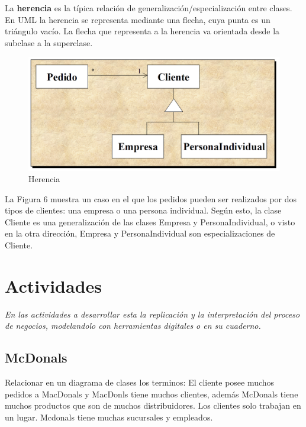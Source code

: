 \documentclass[12pt,letterpaper]{article}
\begin{document}
La \textbf{herencia} es la típica relación de generalización/especialización entre clases. En UML la herencia se representa mediante una flecha, cuya punta es un triángulo vacío. La flecha que representa a la herencia va orientada desde la subclase a la superclase.\\
	\begin{figure}[H]
		\centering
		\includegraphics[scale=0.2]{img/herencia.PNG}     
		\caption{Herencia}
	\label{fig:rc}
	\end{figure}
	\vspace{1cm}
	
La Figura 6 muestra un caso en el que los pedidos pueden ser realizados por dos tipos de clientes: una empresa o una persona individual. Según esto, la clase Cliente es una generalización de las clases Empresa y PersonaIndividual, o visto en la otra dirección, Empresa y PersonaIndividual son especializaciones de Cliente.\\


\section*{\LARGE\textbf{ Actividades}}
\textit{En las actividades a desarrollar esta la replicación y la interpretación del proceso de negocios, modelandolo con herramientas digitales o en su cuaderno.}\\

\subsection{\textbf{McDonals}}
Relacionar en un diagrama de clases los terminos:
El cliente posee muchos pedidos a MacDonals y MacDonls tiene muchos clientes, además McDonals tiene muchos productos que son de muchos distribuidores. Los clientes solo trabajan en un lugar. Mcdonals tiene muchas sucursales y empleados.\\
\end{document}
